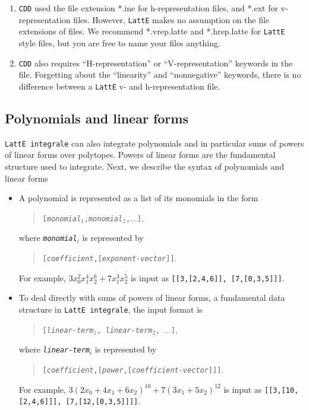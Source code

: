 \documentclass{article}
\newcommand{\latte}{{\tt LattE}\xspace}
\newcommand{\latteInt}{{\tt LattE integrale}\xspace}
\newcommand{\cdd}{{\tt CDD}\xspace}
\begin{document}
\begin{enumerate}
        \item \cdd used the file extension *.ine for h-representation files, and *.ext for v-representation files. However, \latte makes no assumption on the file extensions of files. We recommend *.vrep.latte and *.hrep.latte for \latte style files, but you are free to name your files anything.
        \item \cdd also requires ``H-representation'' or ``V-representation'' keywords in the file. Forgetting about the ``linearity'' and ``nonnegative'' keywords, there is no difference between a \latte v- and h-representation file.
\end{enumerate}


\subsection{Polynomials and linear forms}
\label{input-file:polynomial-and-linear-form}

\latteInt can also integrate polynomials and in particular sums of powers of
linear forms over polytopes. Powers of linear forms are the fundamental structure used to integrate. Next, we describe the syntax of polynomials and linear forms

\begin{itemize}
\item A polynomial is represented as a list of its monomials in the form
  \begin{quote}
    \texttt{[{\itshape monomial}$_1$,{\itshape monomial}$_2$,$\dots$]},
  \end{quote}
  where \texttt{{\itshape monomial}$_i$} is represented by
  \begin{quote}
    \texttt{[{\itshape coefficient},[{\itshape exponent-vector}]]}.
  \end{quote}
  For example, $3x_0^2x_1^4x_2^6 + 7x_1^3x_2^5$ is input as \texttt{[[3,[2,4,6]], [7,[0,3,5]]]}. 

\item To deal directly with sums of powers of linear forms, a fundamental data structure in \latteInt, the input format is 
  \begin{quote}
    \texttt{[{\itshape linear-term$_1$}, {\itshape linear-term$_2$}, $\dots$]},
    \end{quote}
    where \texttt{{\itshape linear-term}$_i$} is represented by
    \begin{quote}
      \texttt{[{\itshape coefficient},[{\itshape power},[{\itshape coefficient-vector}]]]}.
    \end{quote}
    For example, $3(2x_0 + 4x_1 + 6x_2)^{10} + 7(3x_1 + 5x_2)^{12}$ is input
    as \texttt{[[3,[10,[2,4,6]]], [7,[12,[0,3,5]]]]}. 
  \end{itemize}
  
\end{document}
